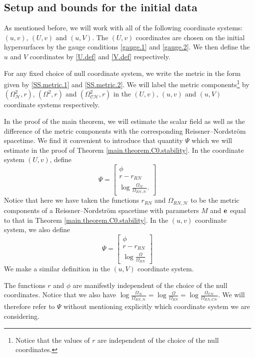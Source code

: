 \documentclass[10pt, reqno]{amsart}
\theoremstyle{definition}
\theoremstyle{remark}
\numberwithin{equation}{section}
\newcommand{\0}{\emptyset}
\newcommand{\Omg}{\Omega}
\newcommand{\f}{\frac}
\begin{document}
\subsection{Setup and bounds for the initial data}\label{sec.data.bound}

As mentioned before, we will work with all of the following coordinate systems: $(u,v)$, $(U,v)$ and $(u,V)$. The $(U,v)$ coordinates are chosen on the initial hypersurfaces by the gauge conditions \eqref{gauge.1} and \eqref{gauge.2}. We then define the $u$ and $V$ coordinates by \eqref{U.def} and \eqref{V.def} respectively.

For any fixed choice of null coordinate system, we write the metric in the form given by \eqref{SS.metric.1} and \eqref{SS.metric.2}. We will label the metric components\footnote{Notice that the values of $r$ are independent of the choice of the null coordinates.} by $(\Omg^2_{\mathcal H}, r)$, $(\Omg^2, r)$ and $(\Omg^2_{\mathcal C\mathcal H}, r)$ in the $(U,v)$, $(u,v)$ and $(u,V)$ coordinate systems respectively.

In the proof of the main theorem, we will estimate the scalar field as well as the difference of the metric components with the corresponding Reissner--Nordstr\"om spacetime. We find it convenient to introduce that quantity $\Psi$ which we will estimate in the proof of Theorem \ref{main.theorem.C0.stability}. In the coordinate system $(U,v)$, define
\begin{equation}\label{Psi.def}
\Psi=\begin{bmatrix}
\phi\\r-r_{RN}\\
\log\f{\Omg_\mathcal H}{\Omg_{RN,\mathcal H}}.
\end{bmatrix}
\end{equation}
Notice that here we have taken the functions $r_{RN}$ and $\Omg_{RN,\mathcal H}$ to be the metric components of a Reissner--Nordstr\"om spacetime with parameters $M$ and ${\bf e}$ equal to that in Theorem \ref{main.theorem.C0.stability}. In the $(u,v)$ coordinate system, we also define
$$\Psi=\begin{bmatrix}
\phi\\r-r_{RN}\\
\log\f{\Omg}{\Omg_{RN}}
\end{bmatrix}$$
We make a similar definition in the $(u,V)$ coordinate system. 

The functions $r$ and $\phi$ are manifestly independent of the choice of the null coordinates. Notice that we also have $\log\f{\Omg_\mathcal H}{\Omg_{RN,\mathcal H}}=\log\f{\Omg}{\Omg_{RN}}=\log\f{\Omg_{\mathcal C\mathcal H}}{\Omg_{RN,\mathcal C\mathcal H}}$. We will therefore refer to $\Psi$ without mentioning explicitly which coordinate system we are considering.
\end{document}
